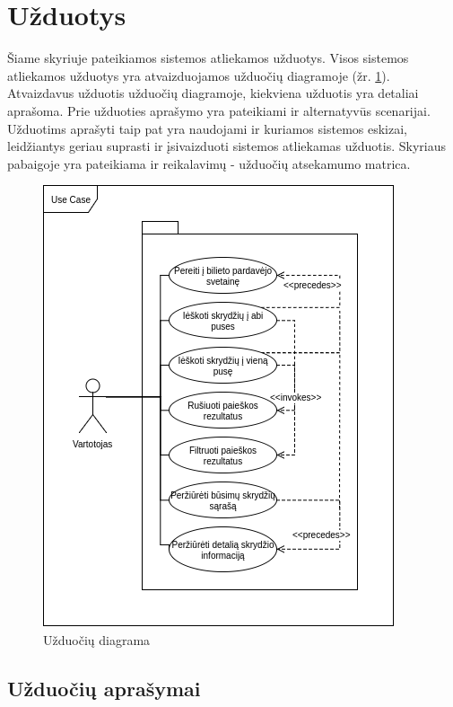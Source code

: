 \documentclass{VUMIFPSkursinis}
\begin{document}
        \section{Užduotys}
        Šiame skyriuje pateikiamos sistemos atliekamos užduotys. Visos sistemos atliekamos užduotys yra atvaizduojamos užduočių diagramoje (žr. \ref{Užduočių diagrama}). Atvaizdavus užduotis užduočių diagramoje, kiekviena užduotis yra detaliai aprašoma. Prie užduoties aprašymo yra pateikiami ir alternatyvūs scenarijai. Užduotims aprašyti taip pat yra naudojami ir kuriamos sistemos eskizai, leidžiantys geriau suprasti ir įsivaizduoti sistemos atliekamas užduotis. Skyriaus pabaigoje yra pateikiama ir reikalavimų - užduočių atsekamumo matrica.
            \begin{figure}[H]
                \centering
                \includegraphics[scale=1]{img/use_case}
                \caption{Užduočių diagrama}
                \label{Užduočių diagrama}
            \end{figure}
            \subsection{Užduočių aprašymai}
                
\end{document}
